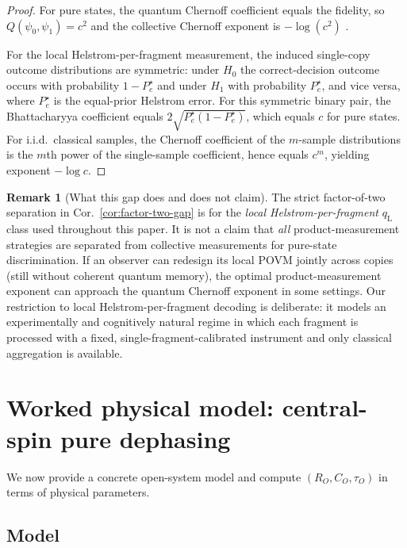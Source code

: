 \documentclass[11pt]{article}
\newcommand{\1}{\mathbf{1}}
\newcommand{\QCBcoef}{Q}
\theoremstyle{definition}
\newtheorem{remark}{Remark}
\theoremstyle{plain}
\begin{document}
\begin{proof}
For pure states, the quantum Chernoff coefficient equals the fidelity, so $\QCBcoef(\psi_0,\psi_1)=c^2$ and the collective Chernoff exponent is $-\log(c^2)$ \citep{Audenaert2007,NussbaumSzkola2009}.

For the local Helstrom-per-fragment measurement, the induced single-copy outcome distributions are symmetric:
under $H_0$ the correct-decision outcome occurs with probability $1-P_e^\star$ and under $H_1$ with probability $P_e^\star$, and vice versa, where $P_e^\star$ is the equal-prior Helstrom error.
For this symmetric binary pair, the Bhattacharyya coefficient equals $2\sqrt{P_e^\star(1-P_e^\star)}$, which equals $c$ for pure states.
For i.i.d.\ classical samples, the Chernoff coefficient of the $m$-sample distributions is the $m$th power of the single-sample coefficient, hence equals $c^m$, yielding exponent $-\log c$.
\end{proof}

\begin{remark}[What this gap does and does not claim]
The strict factor-of-two separation in Cor.~\ref{cor:factor-two-gap} is for the \emph{local Helstrom-per-fragment} $q_{\mathrm{L}}$ class used throughout this paper.
It is not a claim that \emph{all} product-measurement strategies are separated from collective measurements for pure-state discrimination.
If an observer can redesign its local POVM jointly across copies (still without coherent quantum memory), the optimal product-measurement exponent can approach the quantum Chernoff exponent in some settings.
Our restriction to local Helstrom-per-fragment decoding is deliberate: it models an experimentally and cognitively natural regime in which each fragment is processed with a fixed, single-fragment-calibrated instrument and only classical aggregation is available.
\end{remark}


\section{Worked physical model: central-spin pure dephasing}
\label{sec:centralspin}

We now provide a concrete open-system model and compute $(R_O,C_O,\tau_O)$ in terms of physical parameters.

\subsection{Model}
\end{document}
